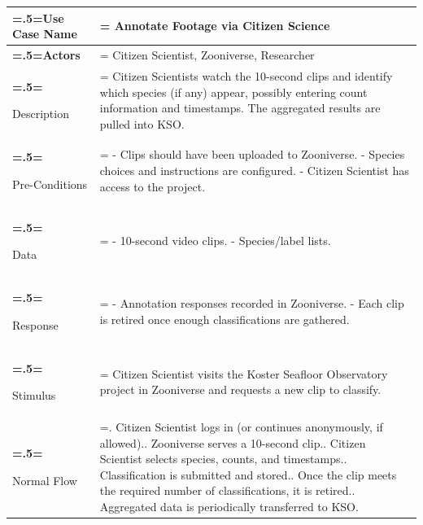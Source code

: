         \begin{table}[H] 
            \centering
            \small
            \begin{tabularx}{\textwidth}{|>{\bfseries\hsize=.5\hsize\linewidth=\hsize}X|
            >{\hsize=1.5\hsize\linewidth=\hsize}X|}
            \hline
            Use Case Name       & Annotate Footage via Citizen Science \\ \hline
            
            Actors              & Citizen Scientist, Zooniverse, Researcher \\ \hline
            
            Description         & 
            Citizen Scientists watch the 10-second clips and identify which species (if any) 
            appear, possibly entering count information and timestamps. The aggregated 
            results are pulled into KSO. \\ \hline
            
            Pre-Conditions      & 
            - Clips should have been uploaded to Zooniverse.\newline
            - Species choices and instructions are configured.\newline
            - Citizen Scientist has access to the project. \\ \hline
            
            Data                & 
            - 10-second video clips.\newline
            - Species/label lists. \\ \hline
            
            Response            & 
            - Annotation responses recorded in Zooniverse.\newline
            - Each clip is retired once enough classifications are gathered. \\ \hline
            
            Stimulus            & 
            Citizen Scientist visits the Koster Seafloor Observatory project in Zooniverse 
            and requests a new clip to classify. \\ \hline
            
            Normal Flow         & 
            1. Citizen Scientist logs in (or continues anonymously, if allowed).\newline
            2. Zooniverse serves a 10-second clip.\newline
            3. Citizen Scientist selects species, counts, and timestamps.\newline
            4. Classification is submitted and stored.\newline
            5. Once the clip meets the required number of classifications, it is retired.\newline
            6. Aggregated data is periodically transferred to KSO. \\ \hline
            

\end{tabularx}
\end{table}
